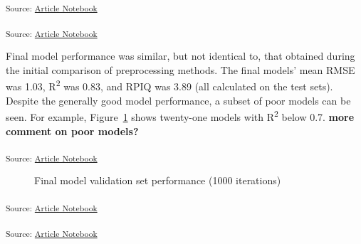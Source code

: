 \documentclass[
]{agujournal2019}
\begin{document}
\textsubscript{Source:
\href{https://rvcrawford.github.io/glowing-system/index-preview.html}{Article
Notebook}}

\textsubscript{Source:
\href{https://rvcrawford.github.io/glowing-system/index-preview.html}{Article
Notebook}}

Final model performance was similar, but not identical to, that obtained
during the initial comparison of preprocessing methods. The final
models' mean RMSE was 1.03, R\textsuperscript{2} was 0.83, and RPIQ was
3.89 (all calculated on the test sets). Despite the generally good model
performance, a subset of poor models can be seen. For example,
Figure~\ref{fig-final-metric-boxplot} shows twenty-one models with
R\textsuperscript{2} below 0.7. \textbf{more comment on poor models?}

\textsubscript{Source:
\href{https://rvcrawford.github.io/glowing-system/index-preview.html}{Article
Notebook}}

\label{cell-fig-final-metric-boxplot}
\begin{figure}[H]


\caption{\label{fig-final-metric-boxplot}Final model validation set
performance (1000 iterations)}

\end{figure}%

\textsubscript{Source:
\href{https://rvcrawford.github.io/glowing-system/index-preview.html}{Article
Notebook}}

\textsubscript{Source:
\href{https://rvcrawford.github.io/glowing-system/index-preview.html}{Article
Notebook}}
\end{document}
